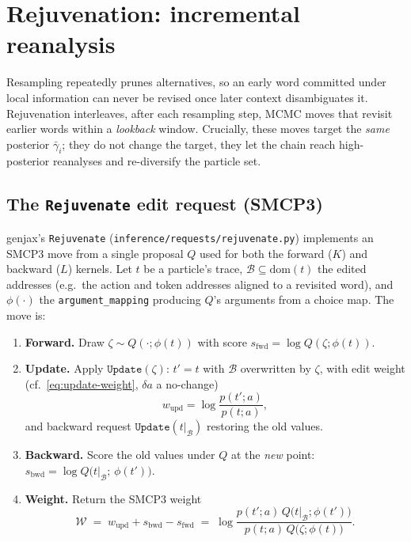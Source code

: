 \documentclass[11pt]{article}
\newcommand{\code}[1]{\texttt{#1}}
\begin{document}
\section{Rejuvenation: incremental reanalysis}
\label{sec:rejuv}

Resampling repeatedly prunes alternatives, so an early word committed under local information can
never be revised once later context disambiguates it. Rejuvenation interleaves, after each
resampling step, MCMC moves that revisit earlier words within a \emph{lookback} window. Crucially,
these moves target the \emph{same} posterior $\bar\gamma_i$; they do not change the target, they let
the chain reach high-posterior reanalyses and re-diversify the particle set.

\subsection{The \texttt{Rejuvenate} edit request (SMCP3)}

genjax's \code{Rejuvenate} (\code{inference/requests/rejuvenate.py}) implements an SMCP3 move
\cite{smcp3} from a single proposal $Q$ used for both the forward ($K$) and backward ($L$) kernels.
Let $t$ be a particle's trace, $\mathcal{B}\subseteq\mathrm{dom}(t)$ the edited addresses (e.g.\ the
action and token addresses aligned to a revisited word), and $\phi(\cdot)$ the
\code{argument\_mapping} producing $Q$'s arguments from a choice map. The move is:
\begin{enumerate}[leftmargin=1.8em,itemsep=1pt]
  \item \textbf{Forward.} Draw $\zeta \sim Q(\cdot;\phi(t))$ with score $s_{\mathrm{fwd}} = \log Q(\zeta;\phi(t))$.
  \item \textbf{Update.} Apply $\code{Update}(\zeta)$: $t' = t$ with $\mathcal{B}$ overwritten by
        $\zeta$, with edit weight (cf.\ \eqref{eq:update-weight}, $\delta a$ a no-change)
        \begin{equation}\label{eq:wupd}
          w_{\mathrm{upd}} = \log\frac{p(t';a)}{p(t;a)},
        \end{equation}
        and backward request $\code{Update}(t|_{\mathcal B})$ restoring the old values.
  \item \textbf{Backward.} Score the old values under $Q$ at the \emph{new} point:
        $s_{\mathrm{bwd}} = \log Q\big(t|_{\mathcal B};\,\phi(t')\big)$.
  \item \textbf{Weight.} Return the SMCP3 weight
        \begin{equation}\label{eq:smcp3}
          \mathcal{W} \;=\; w_{\mathrm{upd}} + s_{\mathrm{bwd}} - s_{\mathrm{fwd}}
          \;=\; \log\frac{p(t';a)\,Q\big(t|_{\mathcal B};\phi(t')\big)}{p(t;a)\,Q\big(\zeta;\phi(t)\big)}.
        \end{equation}
\end{enumerate}
\end{document}
